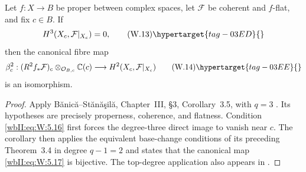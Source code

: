 \begin{proposition}
\hypertarget{tag-03II}{}\label{wbII:prop:analytic-base-change}

Let $f:X\to B$ be proper between complex spaces, let
$\mathcal F$ be coherent and $f$-flat, and fix $c\in B$.  If
\[
H^3(X_c,\mathcal F|_{X_c})=0,
\tag{W.13}\hypertarget{tag-03ED}{}\label{wbII:eq:W:5.16}
\]
then the canonical fibre map
\[
\beta_c^2:
(R^2f_*\mathcal F)_c\otimes_{\mathcal O_{B,c}}\mathbb C(c)
\longrightarrow H^2(X_c,\mathcal F|_{X_c})
\tag{W.14}\hypertarget{tag-03EE}{}\label{wbII:eq:W:5.17}
\]
is an isomorphism.
\end{proposition}



\begin{proof}
Apply B\u{a}nic\u{a}--St\u{a}n\u{a}\c{s}il\u{a},
Chapter~III, \S3, Corollary~3.5, with $q=3$
\cite[pp.~120--121]{BS76push}.  Its hypotheses are precisely
properness, coherence, and flatness.  Condition \eqref{wbII:eq:W:5.16} first forces the
degree-three direct image to vanish near $c$.  The corollary then applies the
equivalent base-change conditions of its preceding Theorem~3.4 in degree
$q-1=2$ and states that the canonical map \eqref{wbII:eq:W:5.17} is bijective.  The top-degree application also appears in
\cite[proof of Lemma~1.5, part~(c), p.~80]{CDP98}.

\end{proof}